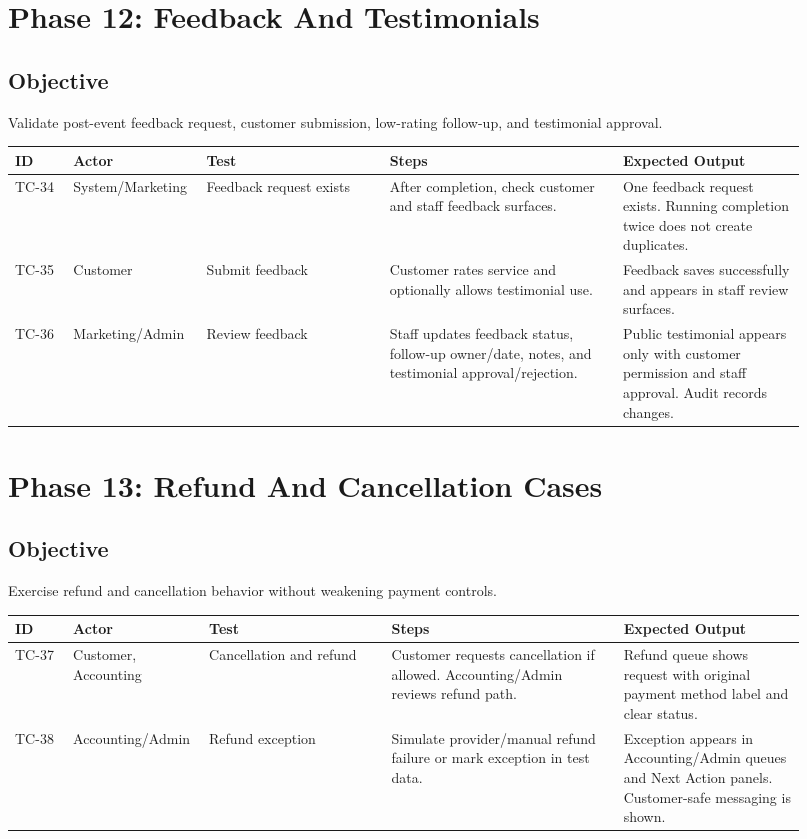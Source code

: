 \documentclass[11pt,a4paper]{article}
\begin{document}
\section{Phase 12: Feedback And Testimonials}
\subsection{Objective}
Validate post-event feedback request, customer submission, low-rating follow-up, and testimonial approval.

\begin{longtable}{p{0.07\linewidth}p{0.13\linewidth}p{0.22\linewidth}p{0.28\linewidth}p{0.22\linewidth}}
\toprule
\textbf{ID} & \textbf{Actor} & \textbf{Test} & \textbf{Steps} & \textbf{Expected Output} \\
\midrule
TC-34 & System/Marketing & Feedback request exists & After completion, check customer and staff feedback surfaces. & One feedback request exists. Running completion twice does not create duplicates. \\
TC-35 & Customer & Submit feedback & Customer rates service and optionally allows testimonial use. & Feedback saves successfully and appears in staff review surfaces. \\
TC-36 & Marketing/Admin & Review feedback & Staff updates feedback status, follow-up owner/date, notes, and testimonial approval/rejection. & Public testimonial appears only with customer permission and staff approval. Audit records changes. \\
\bottomrule
\end{longtable}

\section{Phase 13: Refund And Cancellation Cases}
\subsection{Objective}
Exercise refund and cancellation behavior without weakening payment controls.

\begin{longtable}{p{0.07\linewidth}p{0.13\linewidth}p{0.22\linewidth}p{0.28\linewidth}p{0.22\linewidth}}
\toprule
\textbf{ID} & \textbf{Actor} & \textbf{Test} & \textbf{Steps} & \textbf{Expected Output} \\
\midrule
TC-37 & Customer, Accounting & Cancellation and refund & Customer requests cancellation if allowed. Accounting/Admin reviews refund path. & Refund queue shows request with original payment method label and clear status. \\
TC-38 & Accounting/Admin & Refund exception & Simulate provider/manual refund failure or mark exception in test data. & Exception appears in Accounting/Admin queues and Next Action panels. Customer-safe messaging is shown. \\
\bottomrule
\end{longtable}
\end{document}
